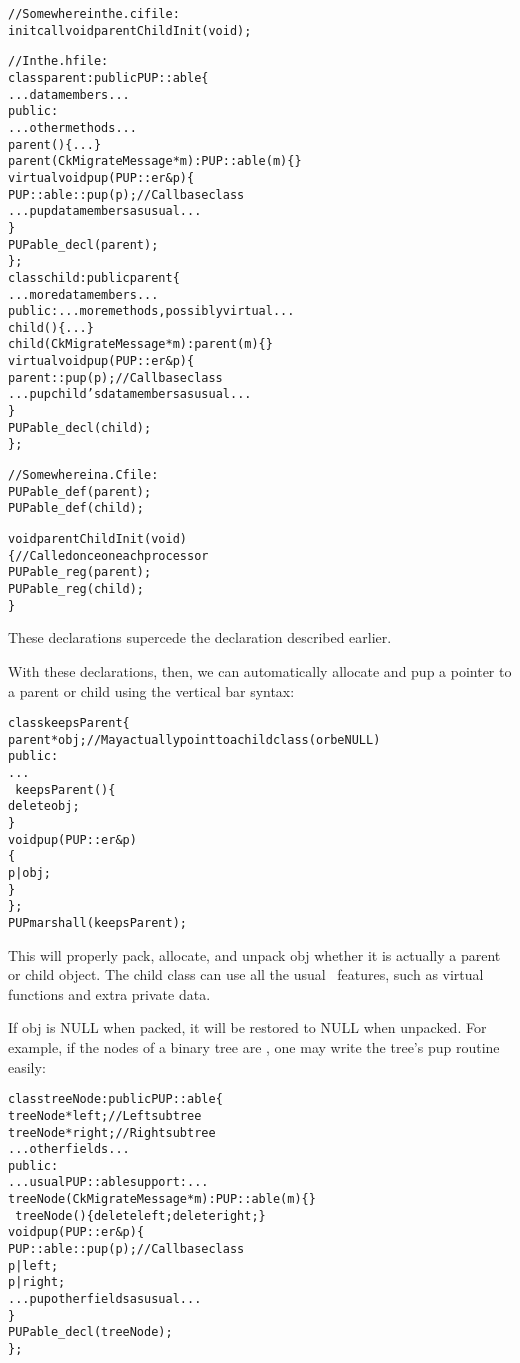 \begin{alltt}
//Somewhere in the .ci file:
   initcall void parentChildInit(void);

//In the .h file:
class parent : public PUP::able \{
    ... data members ...
public:
    ... other methods ...
    parent() \{...\}
    parent(CkMigrateMessage *m) : PUP::able(m) \{\}
    virtual void pup(PUP::er &p) \{
        PUP::able::pup(p);//Call base class
        ... pup data members as usual ...
    \}
    PUPable\_decl(parent);    
\};
class child : public parent \{
    ... more data members ...
public:    ... more methods, possibly virtual ...
    child() \{...\}
    child(CkMigrateMessage *m) : parent(m) \{\}
    virtual void pup(PUP::er &p) \{
        parent::pup(p);//Call base class
        ... pup child's data members as usual ...
    \}
    PUPable\_decl(child);    
\};

//Somewhere in a .C file:
PUPable\_def(parent);
PUPable\_def(child);

void parentChildInit(void)
\{//Called once on each processor
    PUPable\_reg(parent);
    PUPable\_reg(child);
\}
\end{alltt}

These declarations supercede the  declaration 
described earlier.

With these declarations, then, we can automatically 
allocate and pup a pointer to a parent or child
using the vertical bar  syntax:

\begin{alltt}
class keepsParent \{
    parent *obj; //May actually point to a child class (or be NULL)
public:
    ...
    ~keepsParent() \{
        delete obj;
    \}
    void pup(PUP::er &p) 
    \{
        p|obj;
    \}
\};
PUPmarshall(keepsParent);
\end{alltt}

This will properly pack, allocate, and unpack obj whether
it is actually a parent or child object.  The child class 
can use all the usual \CC\ features, such as virtual functions
and extra private data.

If obj is NULL when packed, it will be restored to NULL when unpacked.
For example, if the nodes of a binary tree are ,
one may write the tree's pup routine easily:

\begin{alltt}
class treeNode : public PUP::able \{
    treeNode *left;//Left subtree
    treeNode *right;//Right subtree
    ... other fields ...
public:
    ... usual PUP::able support: ...
    treeNode(CkMigrateMessage *m) : PUP::able(m) \{\}
    ~treeNode() \{delete left; delete right;\}
    void pup(PUP::er &p) \{
        PUP::able::pup(p);//Call base class
        p|left;
        p|right;
        ... pup other fields as usual ...
    \}
    PUPable\_decl(treeNode);
\};
\end{alltt}

